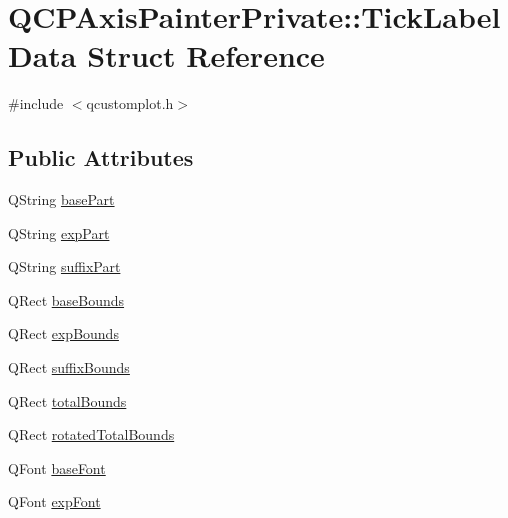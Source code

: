 \hypertarget{struct_q_c_p_axis_painter_private_1_1_tick_label_data}{}\section{Q\+C\+P\+Axis\+Painter\+Private\+::Tick\+Label\+Data Struct Reference}
\label{struct_q_c_p_axis_painter_private_1_1_tick_label_data}


{\ttfamily \#include $<$qcustomplot.\+h$>$}

\subsection*{Public Attributes}
\begin{DoxyCompactItemize}
\item 
Q\+String \mbox{\hyperlink{struct_q_c_p_axis_painter_private_1_1_tick_label_data_ad65b76a5cafc412179a20b5d79809fc4}{base\+Part}}
\item 
Q\+String \mbox{\hyperlink{struct_q_c_p_axis_painter_private_1_1_tick_label_data_a09692e4ea092137278b4ac051d5fdf2b}{exp\+Part}}
\item 
Q\+String \mbox{\hyperlink{struct_q_c_p_axis_painter_private_1_1_tick_label_data_a3cbf21c6411730a318f8d2287b77d840}{suffix\+Part}}
\item 
Q\+Rect \mbox{\hyperlink{struct_q_c_p_axis_painter_private_1_1_tick_label_data_aac1047ae6ab8e9f5a42923082aabfff5}{base\+Bounds}}
\item 
Q\+Rect \mbox{\hyperlink{struct_q_c_p_axis_painter_private_1_1_tick_label_data_a6722d2bcefb93011e9dc42301b966846}{exp\+Bounds}}
\item 
Q\+Rect \mbox{\hyperlink{struct_q_c_p_axis_painter_private_1_1_tick_label_data_aa286a44422223bd4f0b044cc822079f6}{suffix\+Bounds}}
\item 
Q\+Rect \mbox{\hyperlink{struct_q_c_p_axis_painter_private_1_1_tick_label_data_afbb3163cf4c628914f1b703945419ea5}{total\+Bounds}}
\item 
Q\+Rect \mbox{\hyperlink{struct_q_c_p_axis_painter_private_1_1_tick_label_data_aa4d38c5ea47c9184a78ee33ae7f1012e}{rotated\+Total\+Bounds}}
\item 
Q\+Font \mbox{\hyperlink{struct_q_c_p_axis_painter_private_1_1_tick_label_data_a0d4958a706debaa8d19a9b65fc090d56}{base\+Font}}
\item 
Q\+Font \mbox{\hyperlink{struct_q_c_p_axis_painter_private_1_1_tick_label_data_adc10767ebcb719d6927c012a38b9d933}{exp\+Font}}
\end{DoxyCompactItemize}


